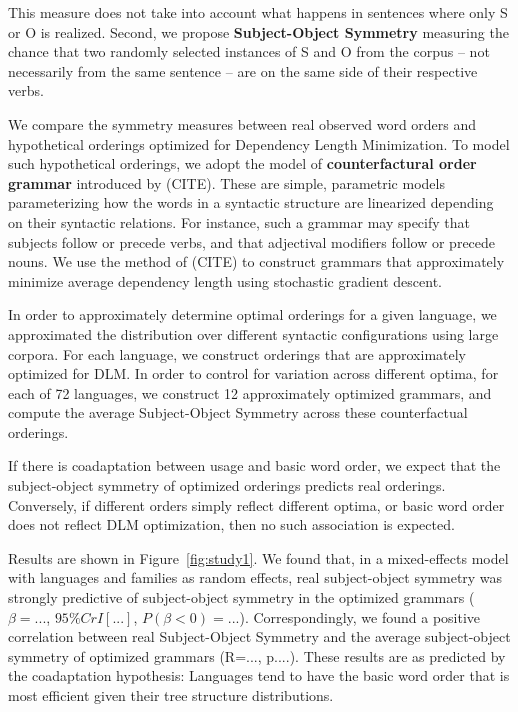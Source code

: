 \documentclass[11pt,a4paper]{article}
\newcommand{\key}[1]{\textbf{#1}}
\begin{document}
This measure does not take into account what happens in sentences where only S or O is realized.
Second, we propose \key{Subject-Object Symmetry} measuring the chance that two randomly selected instances of S and O from the corpus -- not necessarily from the same sentence -- are on the same side of their respective verbs.


We compare the symmetry measures between real observed word orders and hypothetical orderings optimized for Dependency Length Minimization.
To model such hypothetical orderings, we adopt the model of \key{counterfactural order grammar} introduced by (CITE).
These are simple, parametric models parameterizing how the words in a syntactic structure are linearized depending on their syntactic relations.
For instance, such a grammar may specify that subjects follow or precede verbs, and that adjectival modifiers follow or precede nouns.
We use the method of (CITE) to construct grammars that approximately minimize average dependency length using stochastic gradient descent.

In order to approximately determine optimal orderings for a given language, we approximated the distribution over different syntactic configurations using large corpora.
For each language, we construct orderings that are approximately optimized for DLM.
In order to control for variation across different optima, for each of 72 languages, we construct 12 approximately optimized grammars, and compute the average Subject-Object Symmetry across these counterfactual orderings.

If there is coadaptation between usage and basic word order, we expect that the subject-object symmetry of optimized orderings predicts real orderings.
Conversely, if different orders simply reflect different optima, or basic word order does not reflect DLM optimization, then no such association is expected.

Results are shown in Figure~\ref{fig:study1}.
We found that, in a mixed-effects model with languages and families as random effects, real subject-object symmetry was strongly predictive of subject-object symmetry in the optimized grammars ($\beta = ...$, $95\% CrI [...]$, $P(\beta<0) = ...$).
Correspondingly, we found a positive correlation between real Subject-Object Symmetry and the average subject-object symmetry of optimized grammars (R=..., p....).
These results are as predicted by the coadaptation hypothesis: Languages tend to have the basic word order that is most efficient given their tree structure distributions.
\end{document}
